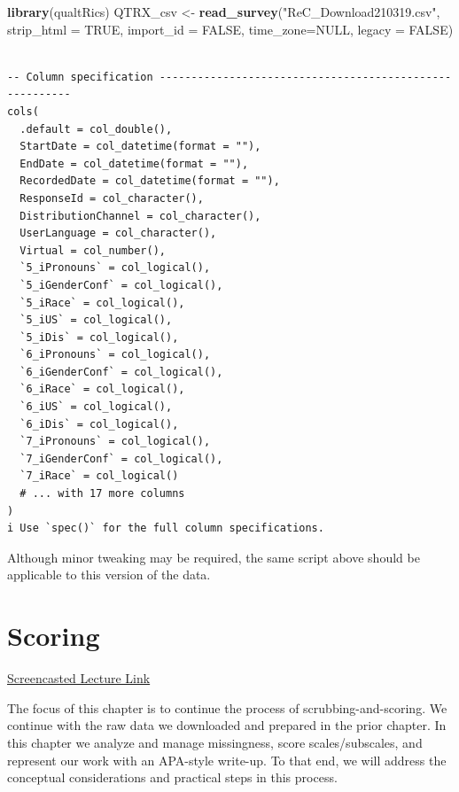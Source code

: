 \documentclass[
  11pt,
]{book}
\newenvironment{Shaded}{\begin{snugshade}}{\end{snugshade}}
\newcommand{\AttributeTok}[1]{\textcolor[rgb]{0.27,0.27,0.27}{#1}}
\newcommand{\ConstantTok}[1]{\textcolor[rgb]{0.37,0.37,0.37}{#1}}
\newcommand{\FunctionTok}[1]{\textcolor[rgb]{0.27,0.27,0.27}{\textbf{#1}}}
\newcommand{\NormalTok}[1]{#1}
\newcommand{\OtherTok}[1]{\textcolor[rgb]{0.37,0.37,0.37}{#1}}
\newcommand{\StringTok}[1]{\textcolor[rgb]{0.5,0.5,0.5}{#1}}
\begin{document}
\begin{Shaded}
\begin{Highlighting}[]
\FunctionTok{library}\NormalTok{(qualtRics)}
\NormalTok{QTRX\_csv }\OtherTok{\textless{}{-}} \FunctionTok{read\_survey}\NormalTok{(}\StringTok{"ReC\_Download210319.csv"}\NormalTok{, }\AttributeTok{strip\_html =} \ConstantTok{TRUE}\NormalTok{, }\AttributeTok{import\_id =} \ConstantTok{FALSE}\NormalTok{, }\AttributeTok{time\_zone=}\ConstantTok{NULL}\NormalTok{, }\AttributeTok{legacy =} \ConstantTok{FALSE}\NormalTok{)}
\end{Highlighting}
\end{Shaded}

\begin{verbatim}

-- Column specification --------------------------------------------------------
cols(
  .default = col_double(),
  StartDate = col_datetime(format = ""),
  EndDate = col_datetime(format = ""),
  RecordedDate = col_datetime(format = ""),
  ResponseId = col_character(),
  DistributionChannel = col_character(),
  UserLanguage = col_character(),
  Virtual = col_number(),
  `5_iPronouns` = col_logical(),
  `5_iGenderConf` = col_logical(),
  `5_iRace` = col_logical(),
  `5_iUS` = col_logical(),
  `5_iDis` = col_logical(),
  `6_iPronouns` = col_logical(),
  `6_iGenderConf` = col_logical(),
  `6_iRace` = col_logical(),
  `6_iUS` = col_logical(),
  `6_iDis` = col_logical(),
  `7_iPronouns` = col_logical(),
  `7_iGenderConf` = col_logical(),
  `7_iRace` = col_logical()
  # ... with 17 more columns
)
i Use `spec()` for the full column specifications.
\end{verbatim}

Although minor tweaking may be required, the same script above should be applicable to this version of the data.

\hypertarget{score}{%
\chapter{Scoring}\label{score}}

\href{https://spu.hosted.panopto.com/Panopto/Pages/Viewer.aspx?pid=18a6be07-5bdc-404d-bc95-acf601830887}{Screencasted Lecture Link}

The focus of this chapter is to continue the process of scrubbing-and-scoring. We continue with the raw data we downloaded and prepared in the prior chapter. In this chapter we analyze and manage missingness, score scales/subscales, and represent our work with an APA-style write-up. To that end, we will address the conceptual considerations and practical steps in this process.
\end{document}

